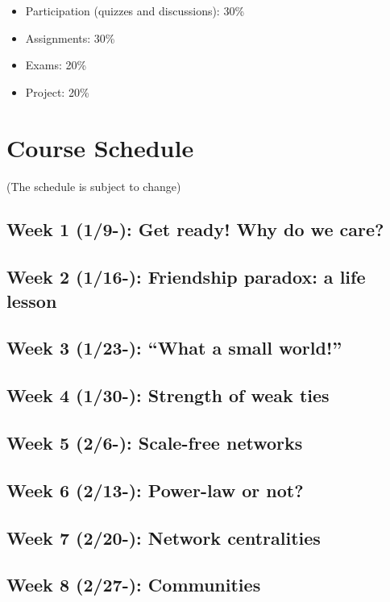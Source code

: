 \documentclass[11pt,article,oneside]{memoir}
\begin{document}
\begin{itemize}

\item Participation (quizzes and discussions): 30\%

\item Assignments: 30\%

\item Exams: 20\%

\item Project: 20\%


\end{itemize}

\section{Course Schedule}

(The schedule is subject to change)

\subsection{Week 1 (1/9-):  Get ready! Why do we care?}
\subsection{Week 2 (1/16-):  Friendship paradox: a life lesson}
\subsection{Week 3 (1/23-):  ``What a small world!''}
\subsection{Week 4 (1/30-):  Strength of weak ties} %
\subsection{Week 5 (2/6-):  Scale-free networks} %
\subsection{Week 6 (2/13-):  Power-law or not?}
\subsection{Week 7 (2/20-):  Network centralities} 
\subsection{Week 8 (2/27-):  Communities}
\end{document}
